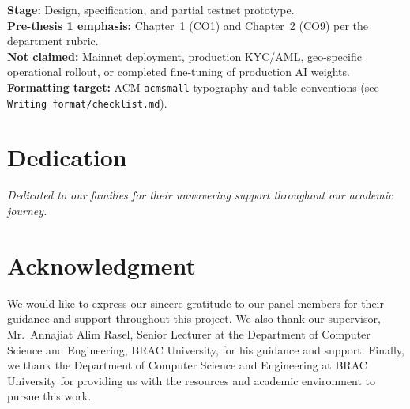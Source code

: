 \documentclass[12pt,a4paper]{report}
\begin{document}
\noindent\textbf{Stage:} Design, specification, and partial testnet prototype.\\
\noindent\textbf{Pre-thesis 1 emphasis:} Chapter~1 (CO1) and Chapter~2 (CO9) per the department rubric.\\
\noindent\textbf{Not claimed:} Mainnet deployment, production KYC/AML, geo-specific operational rollout, or completed fine-tuning of production AI weights.\\
\noindent\textbf{Formatting target:} ACM \texttt{acmsmall} typography and table conventions (see \texttt{Writing format/checklist.md}).

\newpage
\thispagestyle{empty}

\chapter*{Dedication}
{}

\vspace{3cm}
\begin{center}
\textit{Dedicated to our families for their unwavering support throughout our academic journey.}
\end{center}

\newpage
\thispagestyle{empty}

\chapter*{Acknowledgment}
{}

We would like to express our sincere gratitude to our panel members for their guidance and support throughout this project. We also thank our supervisor, Mr.\ Annajiat Alim Rasel, Senior Lecturer at the Department of Computer Science and Engineering, BRAC University, for his guidance and support. Finally, we thank the Department of Computer Science and Engineering at BRAC University for providing us with the resources and academic environment to pursue this work.

\newpage
\setcounter{page}{1}
\tableofcontents
\newpage
{}
{}
\begingroup
\let\oldnumberline\numberline
\renewcommand{\numberline}[1]{\oldnumberline{#1}\hspace{0.75em}}
\listoftables
\endgroup
\newpage
{}
{}
\begingroup
\let\oldnumberline\numberline
\renewcommand{\numberline}[1]{\oldnumberline{#1}\hspace{0.75em}}
\listoffigures
\endgroup
\newpage
\end{document}
